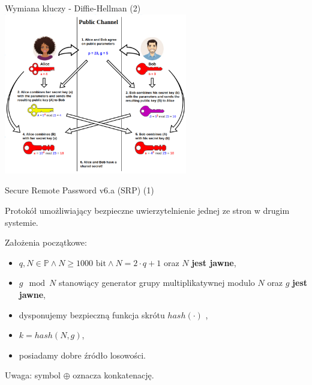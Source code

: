 \documentclass[polish,envcountsect,10pt]{beamer}
\begin{document}
\begin{frame}{Wymiana kluczy - Diffie-Hellman (2)}
    \centering
    \includegraphics[width=8cm]{dh}
\end{frame}
%

\begin{frame}{Secure Remote Password v6.a (SRP) (1)}
    \begin{definition}
        Protokół umożliwiający bezpieczne uwierzytelnienie jednej ze stron w drugim systemie.
    \end{definition}

    Założenia początkowe:
    \begin{itemize}
        \item $ q, N \in \mathbb{P} \land N \ge 1000 \text{ bit} \land N = 2\cdot q + 1 $ oraz $N$ \textbf{jest jawne},
        \item $ g\mod N$ stanowiący generator grupy multiplikatywnej modulo $N$ oraz $g$ \textbf{jest jawne},    %
        \item dysponujemy bezpieczną funkcja skrótu $hash(\cdot)$ ,
        \item $ k = hash(N, g) $,
        \item posiadamy dobre źródło losowości.
    \end{itemize}

    Uwaga: symbol $\oplus$ oznacza konkatenację.
    
\end{frame}
\end{document}
